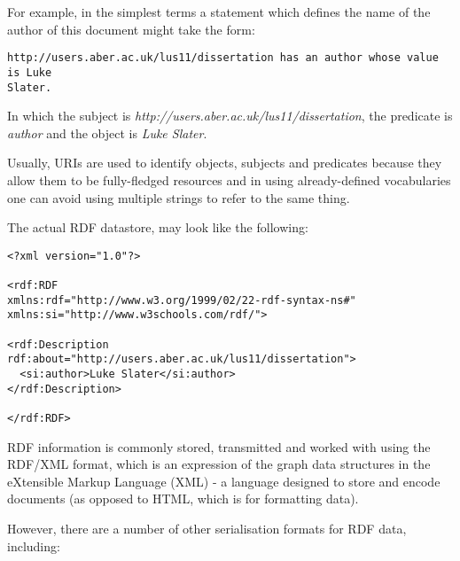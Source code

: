 \documentclass{article}
\begin{document}
For example, in the simplest terms a statement which defines the name of the author of
this document might take the form:

\begin{lstlisting}
http://users.aber.ac.uk/lus11/dissertation has an author whose value is Luke
Slater.
\end{lstlisting}

In which the subject is \emph{http://users.aber.ac.uk/lus11/dissertation}, the
predicate is \emph{author} and the object is \emph{Luke Slater}.

Usually, URIs are used to identify objects, subjects and predicates because they
allow them to be fully-fledged resources and in using already-defined
vocabularies one can avoid using multiple strings to refer to the same thing.

The actual RDF datastore, may look like the following:

\begin{lstlisting}
<?xml version="1.0"?>

<rdf:RDF
xmlns:rdf="http://www.w3.org/1999/02/22-rdf-syntax-ns#"
xmlns:si="http://www.w3schools.com/rdf/">

<rdf:Description rdf:about="http://users.aber.ac.uk/lus11/dissertation">
  <si:author>Luke Slater</si:author>
</rdf:Description>

</rdf:RDF> 
\end{lstlisting}

RDF information is commonly stored, transmitted and worked with using the
RDF/XML format, which is an expression of the graph data structures in the
eXtensible Markup Language (XML) - a language designed to store and encode
documents (as opposed to HTML, which is for formatting data). 

However, there are a number of other serialisation formats for RDF data,
including:
\end{document}
